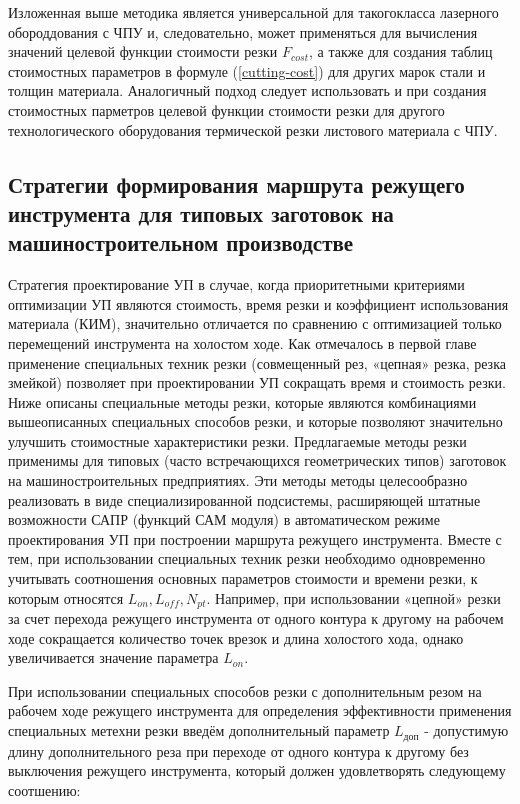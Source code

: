 \documentclass{article}
\begin{document}
Изложенная выше методика является универсальной
для такогокласса лазерного обороддования с ЧПУ и,
следовательно, может применяться для вычисления значений
целевой функции стоимости резки
$F_{cost}$,
а также для создания таблиц стоимостных параметров в формуле (\ref{cutting-cost})
для других марок стали и толщин материала.
Аналогичный подход следует использовать и при создания
стоимостных парметров целевой функции стоимости резки
для другого технологического оборудования термической
резки листового материала с ЧПУ.

\subsection{Стратегии формирования маршрута режущего инструмента для типовых заготовок на машиностроительном производстве}

Стратегия проектирование УП в случае,
когда приоритетными критериями оптимизации УП являются стоимость,
время резки и коэффициент использования материала (КИМ),
значительно отличается по сравнению с оптимизацией
только перемещений инструмента на холостом ходе.
Как отмечалось в первой главе применение специальных техник резки
(совмещенный рез, «цепная» резка, резка змейкой)
позволяет при проектировании УП сокращать время и стоимость резки.
Ниже описаны специальные методы резки,
которые являются комбинациями вышеописанных специальных способов резки,
и которые позволяют значительно улучшить стоимостные характеристики резки.
Предлагаемые методы резки применимы для типовых
(часто встречающихся геометрических типов)
заготовок на машиностроительных предприятиях.
Эти методы методы целесообразно реализовать в
виде специализированной подсистемы,
расширяющей штатные возможности САПР (функций САМ модуля)
в автоматическом режиме проектирования УП при построении
маршрута режущего инструмента.
Вместе с тем, при использовании специальных техник
резки необходимо одновременно учитывать соотношения
основных параметров стоимости и времени резки,
к которым относятся
$L_{on}, L_{off}, N_{pt}$.
Например, при использовании «цепной» резки
за счет перехода режущего инструмента от одного
контура к другому на рабочем ходе сокращается
количество точек врезок и длина холостого хода,
однако увеличивается значение параметра
$L_{on}$.

При использовании специальных способов резки
с дополнительным резом на рабочем ходе режущего инструмента
для определения эффективности применения специальных
метехни резки введём дополнительный параметр
$L_\text{доп}$ - допустимую длину дополнительного реза
при переходе от одного контура к другому
без выключения режущего инструмента,
который должен удовлетворять следующему соотшению:
\end{document}
